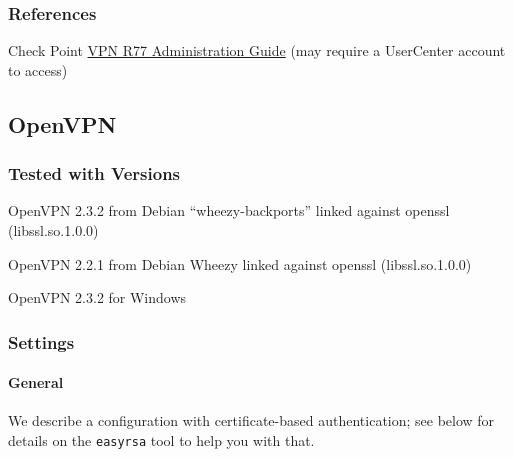 

\subsubsection{References}
\begin{itemize*}
  \item Check Point \href{https://sc1.checkpoint.com/documents/R77/CP_R77_VPN_AdminGuide/html_frameset.htm}{VPN R77 Administration Guide} (may require a UserCenter account to access)
\end{itemize*}


\subsection{OpenVPN}

\subsubsection{Tested with Versions}
\begin{itemize*}
  \item OpenVPN 2.3.2 from Debian ``wheezy-backports'' linked against openssl (libssl.so.1.0.0) 
  \item OpenVPN 2.2.1 from Debian Wheezy linked against openssl
    (libssl.so.1.0.0) 
  \item OpenVPN 2.3.2 for Windows
\end{itemize*}

\subsubsection{Settings}

\paragraph{General}
We describe a configuration with certificate-based authentication; see
below for details on the \verb|easyrsa| tool to help you with that.

